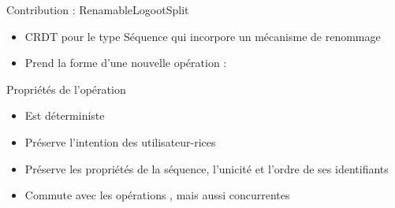 \begin{frame}{Contribution : RenamableLogootSplit}
    \begin{itemize}
        \item CRDT pour le type Séquence qui incorpore un mécanisme de renommage
        \item Prend la forme d'une nouvelle opération : \ren
    \end{itemize}
    \begin{block}{Propriétés de l'opération \ren}
        \begin{itemize}
            \item Est déterministe
            \item Préserve l'intention des utilisateur-rices
            \item Préserve les propriétés de la séquence, \ie l'unicité et l'ordre de ses identifiants
            \item Commute avec les opérations \ins, \rmv mais aussi \ren concurrentes
        \end{itemize}
    \end{block}
\end{frame}
